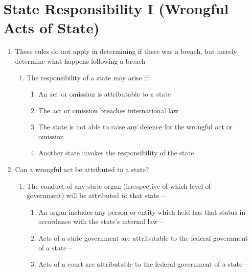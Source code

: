 \section{State Responsibility I (Wrongful Acts of State)}
\begin{enumerate}
    \item These rules do not apply in determining if there was a breach, but merely determine what happens following a breach -- 
    \begin{enumerate}
        \item The responsibility of a state may arise if:
        \begin{enumerate}
            \item An act or omission is attributable to a state
            \item The act or omission breaches international law
            \item The state is not able to raise any defence for the wrongful act or omission
            \item Another state invokes the responsibility of the state
        \end{enumerate}
    \end{enumerate}
    \item Can a wrongful act be attributed to a state?
    \begin{enumerate}
        \item The conduct of any state organ (irrespective of which level of government) will be attributed to that state -- 
        \begin{enumerate}
            \item An organ includes any person or entity which held has that status in accordance with the state's internal law -- 
            \item Acts of a state government are attributable to the federal government of a state -- 
            \item Acts of a court are attributable to the federal government of a state -- 
        \end{enumerate}

\end{enumerate}
\end{enumerate}
